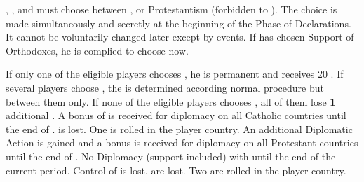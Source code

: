 
\phevnt
\aparag \FRA, \SPA, \ENG and \POL must choose between \CATHCR, \CATHCO or
Protestantism (forbidden to \SPA). The choice is made simultaneously and
secretly at the beginning of the Phase of Declarations. It cannot be
voluntarily changed later except by events. If \POL has chosen Support of
Orthodoxes, he is complied to choose \CATHCO now.

\aparag[\CATHCR]
\bparag If only one of the eligible players chooses \CATHCR, he is permanent
\SDCF and receives 20 \VP.
\bparag If several players choose \CATHCR, the \SDCF is determined according
normal procedure but between them only.
\bparag If none of the eligible players chooses \CATHCR, all of them lose {\bf
  1} additional \STAB.
\bparag A bonus of  is received for diplomacy on all Catholic
countries until the end of .
\aparag[\CATHCO]
 \STAB is lost.
\bparag One \REVOLT is rolled in the player country.
\bparag An additional Diplomatic Action is gained and a  bonus is
received for diplomacy on all Protestant countries until the end of
.
\aparag[Protestantism]
\bparag No Diplomacy (support included) with \payspapaute until the end of the
current period. Control of \payspapaute is lost.
 \STAB are lost.
\bparag Two \REVOLT are rolled in the player country.


